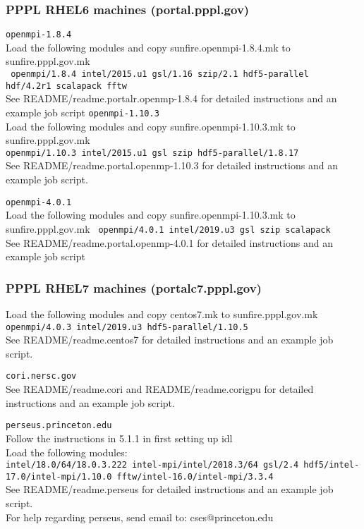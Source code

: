 \subsubsection{PPPL RHEL6 machines (portal.pppl.gov)}
\texttt{openmpi-1.8.4}
\\
Load the following modules and copy sunfire.openmpi-1.8.4.mk to sunfire.pppl.gov.mk
\\
\texttt{
openmpi/1.8.4		intel/2015.u1		gsl/1.16			szip/2.1      	hdf5-parallel 
\\
hdf/4.2r1		scalapack		fftw			
}
\\
See README/readme.portalr.openmp-1.8.4 for detailed instructions and an example job script
\texttt{openmpi-1.10.3}
\\
Load the following modules and copy sunfire.openmpi-1.10.3.mk to sunfire.pppl.gov.mk
\\
\texttt{openmpi/1.10.3	intel/2015.u1		gsl		szip                     	hdf5-parallel/1.8.17 
}
\\
See README/readme.portal.openmp-1.10.3 for detailed instructions and an example job script.

\texttt{openmpi-4.0.1}
\\
Load the following modules and copy sunfire.openmpi-1.10.3.mk to sunfire.pppl.gov.mk
\texttt{
openmpi/4.0.1		intel/2019.u3		gsl		szip                     	scalapack 
}\\
See README/readme.portal.openmp-4.0.1 for detailed instructions and an example job script
\subsubsection{PPPL RHEL7 machines (portalc7.pppl.gov)}
Load the following modules and copy centos7.mk to sunfire.pppl.gov.mk
\texttt{openmpi/4.0.3		intel/2019.u3		hdf5-parallel/1.10.5 
}\\
See README/readme.centos7 for detailed instructions and an example job script.

\texttt{cori.nersc.gov 
}\\
See README/readme.cori and README/readme.corigpu for detailed instructions and an example job script.

\texttt{perseus.princeton.edu}
\\
Follow the instructions in 5.1.1 in first setting up idl 
\\
Load the following modules:
\\
\texttt{intel/18.0/64/18.0.3.222		intel-mpi/intel/2018.3/64		gsl/2.4
hdf5/intel-17.0/intel-mpi/1.10.0	fftw/intel-16.0/intel-mpi/3.3.4
}\\
See README/readme.perseus for detailed instructions and an example job script.
\\
For help regarding perseus, send email to:  cses@princeton.edu

